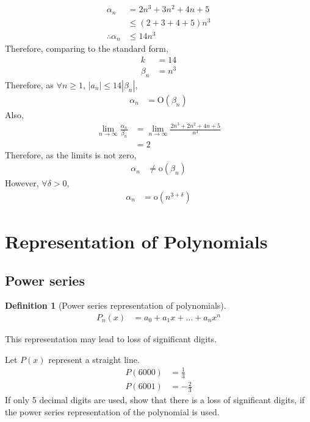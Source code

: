 \documentclass[fleqn, a4paper, 12pt, twoside]{article}
\theoremstyle{definition}
\newtheorem{definition}{Definition}
\theoremstyle{theorem}
\begin{document}
\begin{solution}
	\begin{align*}
		\alpha_n &= 2 n^3 + 3 n^2 + 4 n + 5\\
		&\le (2 + 3 + 4 + 5) n^3\\
		\therefore \alpha_n &\le 14 n^3
	\end{align*}
	Therefore, comparing to the standard form,
	\begin{align*}
		k &= 14\\
		\beta_n &= n^3
	\end{align*}
	Therefore, as $\forall n \ge 1$, $|a_n| \le 14 |\beta_n|$,
	\begin{align*}
		\alpha_n &= \mathrm{O}(\beta_n)
	\end{align*}
	Also,
	\begin{align*}
		\lim\limits_{n \to \infty} \frac{\alpha_n}{\beta_n} &= \lim\limits_{n \to \infty} \frac{2 n^3 + 2 n^2 + 4 n + 5}{n^3}\\
		&= 2
	\end{align*}
	Therefore, as the limits is not zero,
	\begin{align*}
		\alpha_n &\neq \mathrm{o}(\beta_n)
	\end{align*}
	However, $\forall \delta > 0$,
	\begin{align*}
		\alpha_n &= \mathrm{o}\left( n^{3 + \delta} \right)
	\end{align*}
\end{solution}

\section{Representation of Polynomials}

\subsection{Power series}	

\begin{definition}[Power series representation of polynomials]
	\begin{align*}
		P_n(x) &= a_0 + a_1 x + \dots + a_n x^n
	\end{align*}
\end{definition}

This representation may lead to loss of significant digits.

\begin{question}
	Let $P(x)$ represent a straight line.
	\begin{align*}
		P(6000) &= \frac{1}{3}\\
		P(6001) &= -\frac{2}{3}
	\end{align*}
	If only 5 decimal digits are used, show that there is a loss of significant digits, if the power series representation of the polynomial is used.
\end{question}
\end{document}
